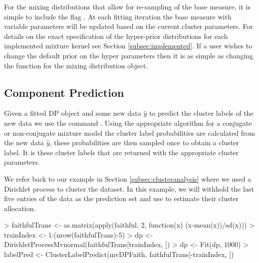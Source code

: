 \documentclass[nojss]{jss}
\begin{document}
For the mixing distributions that allow for re-sampling of the base measure, it is simple to include the flag . At each fitting iteration the base measure with variable parameters will be updated based on the current cluster parameters. For details on the exact specification of the hyper-prior distributions for each implemented mixture kernel see Section \ref{subsec:implemented}.  If a user wishes to change the default prior on the hyper parameters then it is as simple as changing the  function for the mixing distribution object.




\subsection{Component Prediction}
Given a fitted DP object and some new data $\hat{y}$ to predict the cluster labels of the new data we use the command . Using the appropriate algorithm for a conjugate or non-conjugate mixture model the cluster label probabilities are calculated from the new data $\hat{y}$, these probabilities are then sampled once to obtain a cluster label. It is these cluster labels that are returned with the appropriate cluster parameters.

We refer back to our example in Section \ref{subsec:clusteranalysis} where we used a Dirichlet process to cluster the  dataset. In this example, we will withhold the last five entries of the data as the prediction set and use  to estimate their cluster allocation.

\begin{Schunk}
\begin{Sinput}
> faithfulTrans <- as.matrix(apply(faithful, 2, function(x) (x-mean(x))/sd(x)))
> trainIndex <- 1:(nrow(faithfulTrans)-5)
> dp <-  DirichletProcessMvnormal(faithfulTrans[trainIndex, ])
> dp <- Fit(dp, 1000)
> labelPred <- ClusterLabelPredict(mvDPFaith, faithfulTrans[-trainIndex, ])
\end{Sinput}
\end{Schunk}
\end{document}
